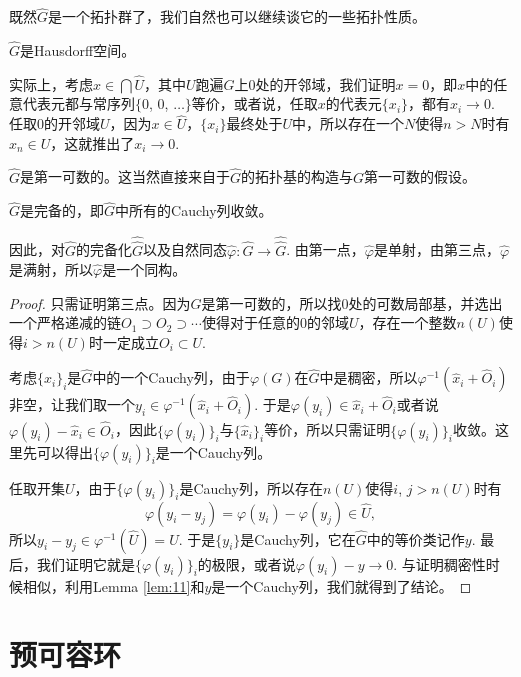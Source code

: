 \begin{para}
	既然$\hat{G}$是一个拓扑群了，我们自然也可以继续谈它的一些拓扑性质。
	\begin{compactenum}
	\item $\hat{G}$是Hausdorff空间。

		实际上，考虑$x\in \bigcap\hat{U}$，其中$U$跑遍$G$上$0$处的开邻域，我们证明$x=0$，即$x$中的任意代表元都与常序列$\{0$, $0$, $\dots\}$等价，或者说，任取$x$的代表元$\{x_i\}$，都有$x_i\to 0$. 任取$0$的开邻域$U$，因为$x\in \hat{U}$，$\{x_i\}$最终处于$U$中，所以存在一个$N$使得$n>N$时有$x_n\in U$，这就推出了$x_i\to 0$.
	\item $\hat{G}$是第一可数的。这当然直接来自于$\hat{G}$的拓扑基的构造与$G$第一可数的假设。

	\item $\hat{G}$是完备的，即$\hat{G}$中所有的Cauchy列收敛。
	\item 因此，对$\hat{G}$的完备化$\hat{\hat G}$以及自然同态$\hat\varphi:\hat{G}\to\hat{\hat G}$. 由第一点，$\hat\varphi$是单射，由第三点，$\hat\varphi$是满射，所以$\hat\varphi$是一个同构。
	\end{compactenum}

	\begin{proof}
		只需证明第三点。因为$G$是第一可数的，所以找$0$处的可数局部基，并选出一个严格递减的链$O_1\supset O_2\supset \cdots$使得对于任意的$0$的邻域$U$，存在一个整数$n(U)$使得$i>n(U)$时一定成立$O_i\subset U$. 

		考虑$\{\hat{x}_i\}_i$是$\hat{G}$中的一个Cauchy列，由于$\varphi(G)$在$\hat{G}$中是稠密，所以$\varphi^{-1}(\hat{x}_i+\hat{O}_i)$非空，让我们取一个$y_i\in\varphi^{-1}(\hat{x}_i+\hat{O}_i)$. 于是$\varphi(y_i)\in \hat{x}_i+\hat{O}_i$或者说$\varphi(y_i)-\hat{x}_i\in \hat{O}_i$，因此$\{\varphi(y_i)\}_i$与$\{\hat{x}_i\}_i$等价，所以只需证明$\{\varphi(y_i)\}_i$收敛。这里先可以得出$\{\varphi(y_i)\}_i$是一个Cauchy列。

		任取开集$U$，由于$\{\varphi(y_i)\}_i$是Cauchy列，所以存在$n(U)$使得$i$, $j>n(U)$时有
		\[
		\varphi(y_i-y_j)=\varphi(y_i)-\varphi(y_j)\in \hat{U},
		\]
		所以$y_i-y_j\in \varphi^{-1}(\hat{U})=U$. 于是$\{y_i\}$是Cauchy列，它在$\hat G$中的等价类记作$y$. 最后，我们证明它就是$\{\varphi(y_i)\}_i$的极限，或者说$\varphi(y_i)-y\to 0$. 与证明稠密性时候相似，利用Lemma \ref{lem:11}和$y$是一个Cauchy列，我们就得到了结论。
	\end{proof}
\end{para}

\section{预可容环}

